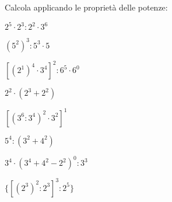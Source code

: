% 
\pagebreak %
\begin{esercizio}
Calcola applicando le proprietà delle potenze:
 \begin{htmulticols}{2}
 \begin{enumeratees}
 \item \(2^5\cdot2^3:2^2\cdot3^6\) 
 \item \((5^2)^3:5^3\cdot5\) 
 \item \([(2^1)^4\cdot 3^4]^2:6^5\cdot6^0\) 
% 
% 
 \item \(2^2\cdot(2^3+2^2)\) 
 \item \([(3^6:3^4)^2\cdot3^2]^1\) 
 \item \(5^4 : (3^2+4^2)\) 
 \item \(3^4\cdot(3^4+4^2-2^2)^0:3^3\) 
 \item \(\{[(2^3)^2:2^3]^3:2^5\}\) 
 \end{enumeratees}
 \end{htmulticols}
\end{esercizio}

